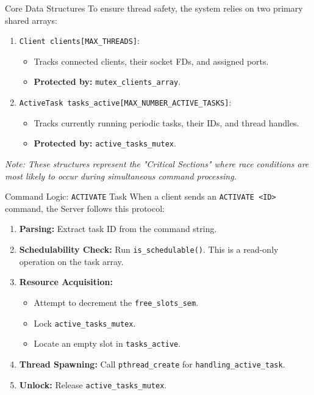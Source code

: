 \begin{frame}{Core Data Structures}
    To ensure thread safety, the system relies on two primary shared arrays:
    \begin{enumerate}
        \item \texttt{Client clients[MAX\_THREADS]}:
        \begin{itemize}
            \item Tracks connected clients, their socket FDs, and assigned ports.
            \item \textbf{Protected by:} \texttt{mutex\_clients\_array}.
        \end{itemize}
        \item \texttt{ActiveTask tasks\_active[MAX\_NUMBER\_ACTIVE\_TASKS]}:
        \begin{itemize}
            \item Tracks currently running periodic tasks, their IDs, and thread handles.
            \item \textbf{Protected by:} \texttt{active\_tasks\_mutex}.
        \end{itemize}
    \end{enumerate}
    \vspace{0.3cm}
    \textit{Note: These structures represent the "Critical Sections" where race conditions are most likely to occur during simultaneous command processing.}
\end{frame}

\begin{frame}{Command Logic: \texttt{ACTIVATE} Task}
    When a client sends an \texttt{ACTIVATE <ID>} command, the Server follows this protocol:
    \begin{enumerate}
        \item \textbf{Parsing:} Extract task ID from the command string.
        \item \textbf{Schedulability Check:} Run \texttt{is\_schedulable()}. This is a read-only operation on the task array.
        \item \textbf{Resource Acquisition:} 
        \begin{itemize}
            \item Attempt to decrement the \texttt{free\_slots\_sem}.
            \item Lock \texttt{active\_tasks\_mutex}.
            \item Locate an empty slot in \texttt{tasks\_active}.
        \end{itemize}
        \item \textbf{Thread Spawning:} Call \texttt{pthread\_create} for \texttt{handling\_active\_task}.
        \item \textbf{Unlock:} Release \texttt{active\_tasks\_mutex}.
    \end{enumerate}
\end{frame}


